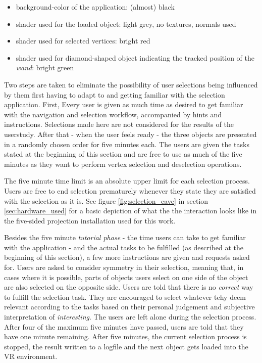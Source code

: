 \begin{itemize}
	\item background-color of the application: (almost) black
	\item shader used for the loaded object: light grey, no textures, normals used
	\item shader used for selected vertices: bright red
	\item shader used for diamond-shaped object indicating the tracked position of the \textit{wand}: bright green
\end{itemize}

Two steps are taken to eliminate the possibility of user selections being influenced by them first having to adapt to and getting familiar with the selection application. First, Every user is given as much time as desired to get familiar with the navigation and selection workflow, accompanied by hints and instructions. Selections made here are not considered for the results of the userstudy. After that - when the user feels ready - the three objects are presented in a randomly chosen order for five minutes each. The users are given the tasks stated at the beginning of this section and are free to use as much of the five minutes as they want to perform vertex selection and deselection operations.

The five minute time limit is an absolute upper limit for each selection process. Users are free to end selection prematurely whenever they state they are satisfied with the selection as it is. See figure \ref{fig:selection_cave} in section \ref{sec:hardware_used} for a basic depiction of what the the interaction looks like in the five-sided projection installation used for this work.

Besides the five minute \textit{tutorial phase} - the time users can take to get familiar with the application - and the actual tasks to be fulfilled (as described at the beginning of this section), a few more instructions are given and requests asked for. Users are asked to consider symmetry in their selection, meaning that, in cases where it is possible, parts of objects users select on one side of the object are also selected on the opposite side. Users are told that there is no \textit{correct} way to fulfill the selection task. They are encouraged to select whatever tehy deem relevant according to the tasks based on their personal judgement and subjective interpretation of \textit{interesting}. The users are left alone during the selection process. After four of the maximum five minutes have passed, users are told that they have one minute remaining. After five minutes, the current selection process is stopped, the result written to a logfile and the next object gets loaded into the VR environment. 



